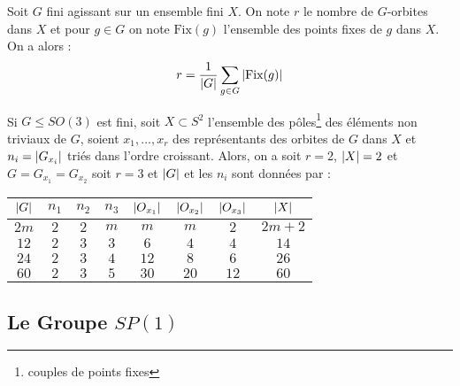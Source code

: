 \documentclass{cours}
\begin{document}
\begin{lemma}
    Soit $G$ fini agissant sur un ensemble fini $X$. On note $r$ le nombre de $G$-orbites dans $X$ et pour $g \in G$ on note $\text{Fix}(g)$ l'ensemble des points fixes de $g$ dans $X$. On a alors :
    \[
        r = \frac{1}{\left|G\right|} \sum_{g \in G}  \left|\text{Fix}(g)\right|
    \]
\end{lemma}

\begin{lemma}
    Si $G \leq SO(3)$ est fini, soit $X \subset S^{2}$ l'ensemble des pôles\footnote{couples de points fixes} des éléments non triviaux de $G$, soient $x_{1}, \ldots, x_{r}$ des représentants des orbites de $G$ dans $X$ et $n_{i} = \left|G_{x_{i}}\right|$ triés dans l'ordre croissant. Alors, on a soit $r = 2$, $\left|X\right| = 2$ et $G = G_{x_{1}} = G_{x_{2}}$ soit $r = 3$ et $\left|G\right|$ et les $n_{i}$ sont données par : 
    \begin{center}
        \begin{tabular}{cccccccc}
            $\left|G\right|$ & $n_{1}$ & $n_{2}$ & $n_{3}$ & $\left|O_{x_{1}}\right|$ & $\left|O_{x_{2}}\right|$ & $\left|O_{x_{3}}\right|$ & $\left|X\right|$\\
            \midrule
            $2m$ & $2$ & $2$ & $m$ & $m$ & $m$ & $2$ & $2m+2$\\
            \midrule
            $12$ & $2$ & $3$ & $3$ & $6$ & $4$ & $4$ & $14$\\
            \midrule
            $24$ & $2$ & $3$ & $4$ & $12$ & $8$ & $6$ & $26$\\
            \midrule
            $60$ & $2$ & $3$ & $5$ & $30$ & $20$ & $12$ & $60$            
        \end{tabular}
    \end{center}
\end{lemma}

\subsection{Le Groupe $SP(1)$}
\end{document}
